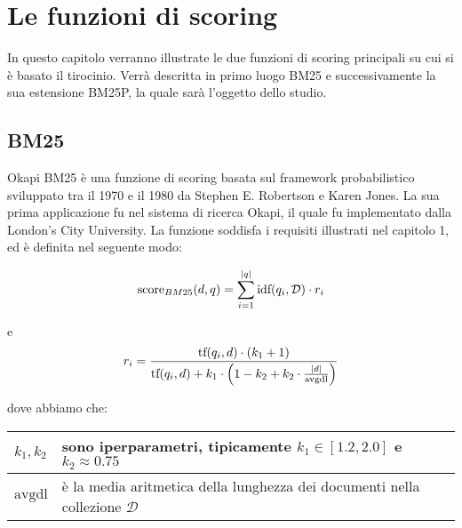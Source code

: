 \chapter{Le funzioni di scoring}
In questo capitolo verranno illustrate le due funzioni di scoring principali su cui si è basato il tirocinio.
Verrà descritta in primo luogo BM25 e successivamente la sua estensione BM25P, la quale sarà l'oggetto
dello studio.

\section{BM25}
Okapi BM25 è una funzione di scoring basata sul framework probabilistico sviluppato tra il 1970 e il 1980
da Stephen E. Robertson e Karen Jones. La sua prima applicazione fu nel sistema di ricerca Okapi, il quale
fu implementato dalla London's City University. La funzione soddisfa i requisiti illustrati nel capitolo 1, ed è definita
nel seguente modo:

\begin{definizione}\label{def:bm25}
	$$
	\text{score}_{BM25}(d, q) = \sum_{i=1}^{|q|} \text{idf}(q_i, \mathcal{D}) \cdot r_i
	$$
	
	e
	$$
	r_i = \frac{
		\text{tf}(q_i, d) \cdot (k_1 +1)
	}{
		\text{tf}(q_i, d) + k_1 \cdot \left(1-k_2 + k_2 \cdot \frac{\left|d\right|}{\text{avgdl}}\right)
	}
	$$
	
	
	dove abbiamo che:
	
	\begin{table}[h]
	\begin{tabular}{|l|p{110mm}|}
		\hline
		$k_1, k_2$ &  sono iperparametri, \newline tipicamente $k_1 \in\left[1.2, 2.0\right]$ e $k_2 \approx 0.75$  \\
		\hline
		$\text{avgdl}$ &  è la media aritmetica della lunghezza dei documenti nella collezione $\mathcal{D}$  \\
		\hline
	\end{tabular}
\end{table}
\end{definizione}


